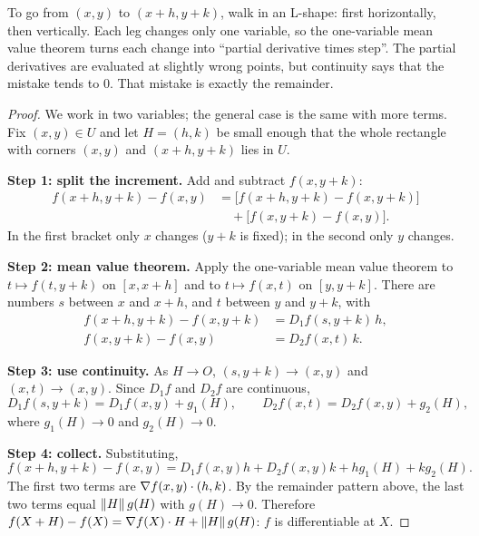 \begin{intuition}
To go from $(x,y)$ to $(x+h,y+k)$, walk in an L-shape: first horizontally, then
vertically. Each leg changes only one variable, so the one-variable mean value theorem
turns each change into ``partial derivative times step''. The partial derivatives are
evaluated at slightly wrong points, but continuity says that the mistake tends to $0$.
That mistake is exactly the remainder.
\begin{center}
\end{center}
\end{intuition}



\begin{proof}
We work in two variables; the general case is the same with more terms. Fix $(x,y)\in U$
and let $H=(h,k)$ be small enough that the whole rectangle with corners $(x,y)$ and
$(x+h,y+k)$ lies in $U$.

\textbf{Step 1: split the increment.} Add and subtract $f(x,y+k)$:
\begin{align*}
f(x+h,y+k)-f(x,y)&=\big[f(x+h,y+k)-f(x,y+k)\big]\\&\quad+\big[f(x,y+k)-f(x,y)\big].
\end{align*}
In the first bracket only $x$ changes ($y+k$ is fixed); in the second only $y$ changes.

\textbf{Step 2: mean value theorem.} Apply the one-variable mean value theorem to
$t\mapsto f(t,y+k)$ on $[x,x+h]$ and to $t\mapsto f(x,t)$ on $[y,y+k]$. There are
numbers $s$ between $x$ and $x+h$, and $t$ between $y$ and $y+k$, with
\begin{align*}
f(x+h,y+k)-f(x,y+k)&=D_1f(s,y+k)\,h,\\ f(x,y+k)-f(x,y)&=D_2f(x,t)\,k .
\end{align*}

\textbf{Step 3: use continuity.} As $H\to O$, $(s,y+k)\to(x,y)$ and $(x,t)\to(x,y)$.
Since $D_1f$ and $D_2f$ are continuous,
\[
D_1f(s,y+k)=D_1f(x,y)+g_1(H),\qquad D_2f(x,t)=D_2f(x,y)+g_2(H),
\]
where $g_1(H)\to0$ and $g_2(H)\to0$.

\textbf{Step 4: collect.} Substituting,
\[
f(x+h,y+k)-f(x,y)=D_1f(x,y)h+D_2f(x,y)k+hg_1(H)+kg_2(H).
\]
The first two terms are $\nabla f(x,y)\cdot(h,k)$. By the remainder pattern above, the
last two terms equal $\left\lVert H\right\rVert g(H)$ with $g(H)\to0$. Therefore
$f(X+H)-f(X)=\nabla f(X)\cdot H+\left\lVert H\right\rVert g(H)$: $f$ is differentiable at $X$.
\end{proof}

